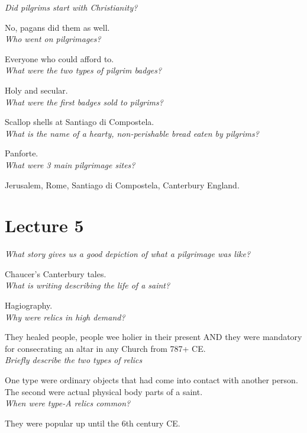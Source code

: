 \documentclass[12pt]{article}
\begin{document}
\textit{Did pilgrims start with Christianity?}

No, pagans did them as well.\\

\textit{Who went on pilgrimages?}

Everyone who could afford to.\\

\textit{What were the two types of pilgrim badges?}

Holy and secular.\\

\textit{What were the first badges sold to pilgrims?}

Scallop shells at Santiago di Compostela.\\

\textit{What is the name of a hearty, non-perishable bread eaten by pilgrims?}

Panforte.\\

\textit{What were 3 main pilgrimage sites?}

Jerusalem, Rome, Santiago di Compostela, Canterbury England.


\section*{Lecture 5}

\textit{What story gives us a good depiction of what a pilgrimage was like?}

Chaucer's Canterbury tales.\\

\textit{What is writing describing the life of a saint?}

Hagiography.\\

\textit{Why were relics in high demand?}

They healed people, people wee holier in their present AND they were mandatory for consecrating an altar in any Church from 787+ CE.\\

\textit{Briefly describe the two types of relics}

One type were ordinary objects that had come into contact with another person. The second were actual physical body parts of a saint.\\

\textit{When were type-A relics common?}

They were popular up until the 6th century CE.\\
\end{document}
